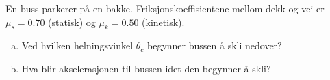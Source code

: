 %
En buss parkerer på en bakke. Friksjonskoeffisientene mellom dekk og vei er $\mu_s = 0.70$ (statisk) og $\mu_k = 0.50$ (kinetisk).
\begin{enumerate}[a)]
    \item Ved hvilken helningsvinkel $\theta_c$ begynner bussen å skli nedover?
    \item Hva blir akselerasjonen til bussen idet den begynner å skli?
\end{enumerate}
